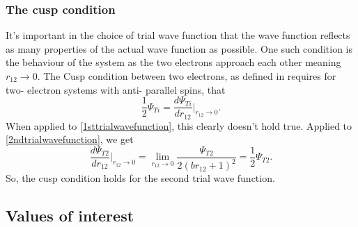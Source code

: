 \documentclass[10pt,a4paper]{article}
\begin{document}
\subsubsection{The cusp condition}
It's important in the choice of trial wave function that the wave function reflects as many properties of the actual wave function as possible. One such condition is the behaviour of the system as the two electrons approach each other meaning $r_{12}\rightarrow 0$. The Cusp condition between two electrons, as defined in \cite{Lecture_Notes_Fall_2015} requires for two- electron systems with anti- parallel spins, that
\begin{equation}
\frac{1}{2}\Psi_{Ti} =\dfrac{d\Psi_{Ti}}{dr_{12}} \Bigg|_{r_{12}\rightarrow 0}.
\end{equation}
When applied to \eqref{1sttrialwavefunction}, this clearly doesn't hold true. Applied to \eqref{2ndtrialwavefunction}, we get
\begin{equation}
\dfrac{d\Psi_{T2}}{dr_{12}} \Bigg|_{r_{12}\rightarrow 0} = \lim_{r_{12}\rightarrow 0} \frac{\Psi_{T2}}{2\left(br_{12}+1\right)^2} = \frac{1}{2}\Psi_{T2}.
\end{equation}
So, the cusp condition holds for the second trial wave function.
\subsection{Values of interest}
\end{document}
